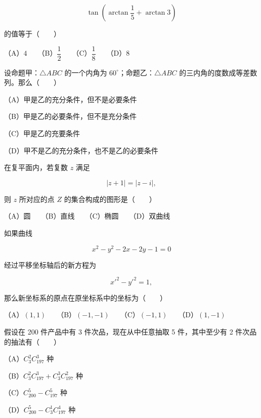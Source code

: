 \begin{question}

\nopagebreak[4]
\[
\tan\left(\arctan\frac15+\arctan3\right)
\]

的值等于\mbox{（　　）}

（A）$4$　　（B）$\dfrac12$　　（C）$\dfrac18$　　（D）$8$

\end{question}
\begin{question}
设命题甲：$\triangle ABC$ 的一个内角为 $60^\circ$；命题乙：$\triangle ABC$ 的三内角的度数成等差数列。那么\mbox{（　　）}

（A）甲是乙的充分条件，但不是必要条件

（B）甲是乙的必要条件，但不是充分条件

（C）甲是乙的充要条件

（D）甲不是乙的充分条件，也不是乙的必要条件

\end{question}
\begin{question}
在复平面内，若复数 $z$ 满足

\nopagebreak[4]
\[
|z+1|=|z-i|,
\]

则 $z$ 所对应的点 $Z$ 的集合构成的图形是\mbox{（　　）}

（A）圆　　（B）直线　　（C）椭圆　　（D）双曲线

\end{question}
\begin{question}
如果曲线

\nopagebreak[4]
\[
x^2-y^2-2x-2y-1=0
\]

经过平移坐标轴后的新方程为

\nopagebreak[4]
\[
x'^2-y'^2=1,
\]

那么新坐标系的原点在原坐标系中的坐标为\mbox{（　　）}

（A）$(1,1)$　　（B）$(-1,-1)$　　（C）$(-1,1)$　　（D）$(1,-1)$

\end{question}
\begin{question}
假设在 200 件产品中有 3 件次品，现在从中任意抽取 5 件，其中至少有 2 件次品的抽法有\mbox{（　　）}

（A）$C_3^2C_{197}^3$ 种

（B）$C_3^2C_{197}^3+C_3^3C_{197}^2$ 种

（C）$C_{200}^5-C_{197}^5$ 种

（D）$C_{200}^5-C_3^1C_{197}^4$ 种

\end{question}
